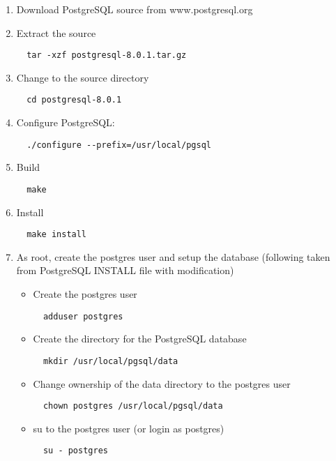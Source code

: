   \begin{enumerate}
  \item Download PostgreSQL source from www.postgresql.org 
  \item Extract the source 
  \begin{verbatim}
  tar -xzf postgresql-8.0.1.tar.gz
  \end{verbatim}

  \item Change to the source directory 
  \begin{verbatim}
  cd postgresql-8.0.1
  \end{verbatim}

  \item Configure PostgreSQL:
  \begin{verbatim}
  ./configure --prefix=/usr/local/pgsql 
  \end{verbatim}

  \item Build
  \begin{verbatim}
  make
  \end{verbatim}

  \item Install
  \begin{verbatim}
  make install
  \end{verbatim}

\item As root, create the postgres user and setup the database (following taken from PostgreSQL INSTALL file with modification)
  \begin{itemize} 
  \item Create the postgres user 
  \begin{verbatim}
  adduser postgres
  \end{verbatim}

  \item Create the directory for the PostgreSQL database 
  \begin{verbatim}
  mkdir /usr/local/pgsql/data
  \end{verbatim}

  \item Change ownership of the data directory to the postgres user
  \begin{verbatim}
  chown postgres /usr/local/pgsql/data
  \end{verbatim}

\item su to the postgres user (or login as postgres)
  \begin{verbatim}
  su - postgres
  \end{verbatim}


\end{itemize}
\end{enumerate}
